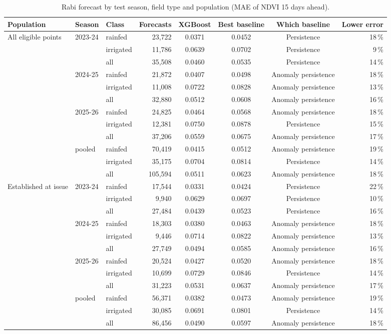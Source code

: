 \begin{table}[H]
\centering
\caption{Rabi forecast by test season, field type and population (MAE of NDVI 15 days ahead).}
\label{tab:r_breakdown}
\scriptsize
\begin{tabular}{@{}lllrcccr@{}}
\toprule
\textbf{Population} & \textbf{Season} & \textbf{Class} & \textbf{Forecasts} & \textbf{XGBoost} & \textbf{Best baseline} & \textbf{Which baseline} & \textbf{Lower error} \\
\midrule
All eligible points & 2023-24 & rainfed & 23,722 & 0.0371 & 0.0452 & Persistence & 18\,\% \\
 &  & irrigated & 11,786 & 0.0639 & 0.0702 & Persistence & 9\,\% \\
 &  & all & 35,508 & 0.0460 & 0.0535 & Persistence & 14\,\% \\
 & 2024-25 & rainfed & 21,872 & 0.0407 & 0.0498 & Anomaly persistence & 18\,\% \\
 &  & irrigated & 11,008 & 0.0722 & 0.0828 & Anomaly persistence & 13\,\% \\
 &  & all & 32,880 & 0.0512 & 0.0608 & Anomaly persistence & 16\,\% \\
 & 2025-26 & rainfed & 24,825 & 0.0464 & 0.0568 & Anomaly persistence & 18\,\% \\
 &  & irrigated & 12,381 & 0.0750 & 0.0878 & Persistence & 15\,\% \\
 &  & all & 37,206 & 0.0559 & 0.0675 & Anomaly persistence & 17\,\% \\
 & pooled & rainfed & 70,419 & 0.0415 & 0.0512 & Anomaly persistence & 19\,\% \\
 &  & irrigated & 35,175 & 0.0704 & 0.0814 & Persistence & 14\,\% \\
 &  & all & 105,594 & 0.0511 & 0.0623 & Anomaly persistence & 18\,\% \\
\midrule
Established at issue & 2023-24 & rainfed & 17,544 & 0.0331 & 0.0424 & Persistence & 22\,\% \\
 &  & irrigated & 9,940 & 0.0629 & 0.0697 & Persistence & 10\,\% \\
 &  & all & 27,484 & 0.0439 & 0.0523 & Persistence & 16\,\% \\
 & 2024-25 & rainfed & 18,303 & 0.0380 & 0.0463 & Anomaly persistence & 18\,\% \\
 &  & irrigated & 9,446 & 0.0714 & 0.0822 & Anomaly persistence & 13\,\% \\
 &  & all & 27,749 & 0.0494 & 0.0585 & Anomaly persistence & 16\,\% \\
 & 2025-26 & rainfed & 20,524 & 0.0427 & 0.0520 & Anomaly persistence & 18\,\% \\
 &  & irrigated & 10,699 & 0.0729 & 0.0846 & Persistence & 14\,\% \\
 &  & all & 31,223 & 0.0531 & 0.0637 & Anomaly persistence & 17\,\% \\
 & pooled & rainfed & 56,371 & 0.0382 & 0.0473 & Anomaly persistence & 19\,\% \\
 &  & irrigated & 30,085 & 0.0691 & 0.0801 & Persistence & 14\,\% \\
 &  & all & 86,456 & 0.0490 & 0.0597 & Anomaly persistence & 18\,\% \\
\bottomrule
\end{tabular}
\end{table}
